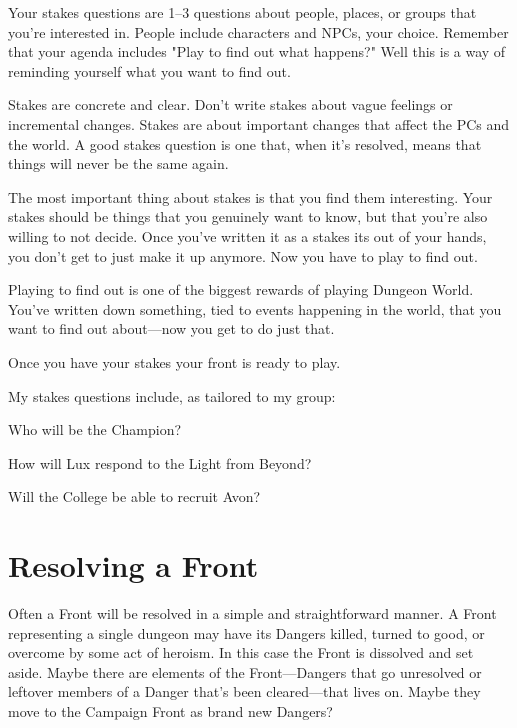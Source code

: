 Your stakes questions are 1–3 questions about people, places, or groups that you're interested in. People include characters and NPCs, your choice. Remember that your agenda includes "Play to find out what happens?" Well this is a way of reminding yourself what you want to find out.

       

Stakes are concrete and clear. Don't write stakes about vague feelings or incremental changes. Stakes are about important changes that affect the PCs and the world. A good stakes question is one that, when it's resolved, means that things will never be the same again.

       

The most important thing about stakes is that you find them interesting. Your stakes should be things that you genuinely want to know, but that you're also willing to not decide. Once you've written it as a stakes its out of your hands, you don't get to just make it up anymore. Now you have to play to find out.

       

Playing to find out is one of the biggest rewards of playing Dungeon World. You've written down something, tied to events happening in the world, that you want to find out about—now you get to do just that.

       

Once you have your stakes your front is ready to play.

       
\startExample
My stakes questions include, as tailored to my group: 
\startitemize[1,packed]

\item Who will be the Champion?


\item How will Lux respond to the Light from Beyond?


\item Will the College be able to recruit Avon?


\stopitemize

\stopExample
       
\section{Resolving a Front}   
       

Often a Front will be resolved in a simple and straightforward manner. A Front representing a single dungeon may have its Dangers killed, turned to good, or overcome by some act of heroism. In this case the Front is dissolved and set aside. Maybe there are elements of the Front—Dangers that go unresolved or leftover members of a Danger that’s been cleared—that lives on. Maybe they move to the Campaign Front as brand new Dangers?


